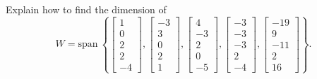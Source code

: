 \documentclass{article}
\begin{document}
\begin{exerciseStatement}
    Explain how to find the dimension of
\[W=\mathrm{span}\ \left\{\left[\begin{array}{r}
1 \\
0 \\
2 \\
2 \\
-4
\end{array}\right] , \left[\begin{array}{r}
-3 \\
3 \\
0 \\
2 \\
1
\end{array}\right] , \left[\begin{array}{r}
4 \\
-3 \\
2 \\
0 \\
-5
\end{array}\right] , \left[\begin{array}{r}
-3 \\
-3 \\
-3 \\
2 \\
-4
\end{array}\right] , \left[\begin{array}{r}
-19 \\
9 \\
-11 \\
2 \\
16
\end{array}\right]\right\}.\]



  
\end{exerciseStatement}
\end{document}
